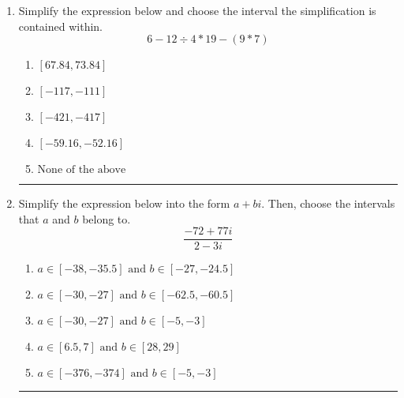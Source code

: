 \documentclass[14pt]{extbook}
\newcommand{\litem}[1]{\item#1\hspace*{-1cm}\rule{\textwidth}{0.4pt}}
\begin{document}
\begin{enumerate}
{\begin{enumerate}[label=\Alph*.]
\end{enumerate} }
\litem{
Simplify the expression below and choose the interval the simplification is contained within.\[ 6 - 12 \div 4 * 19 - (9 * 7) \]\begin{enumerate}[label=\Alph*.]
\item \( [67.84, 73.84] \)
\item \( [-117, -111] \)
\item \( [-421, -417] \)
\item \( [-59.16, -52.16] \)
\item \( \text{None of the above} \)

\end{enumerate} }
\litem{
Simplify the expression below into the form $a+bi$. Then, choose the intervals that $a$ and $b$ belong to.\[ \frac{-72 + 77 i}{2 - 3 i} \]\begin{enumerate}[label=\Alph*.]
\item \( a \in [-38, -35.5] \text{ and } b \in [-27, -24.5] \)
\item \( a \in [-30, -27] \text{ and } b \in [-62.5, -60.5] \)
\item \( a \in [-30, -27] \text{ and } b \in [-5, -3] \)
\item \( a \in [6.5, 7] \text{ and } b \in [28, 29] \)
\item \( a \in [-376, -374] \text{ and } b \in [-5, -3] \)

\end{enumerate} }
\end{enumerate}
\end{document}
